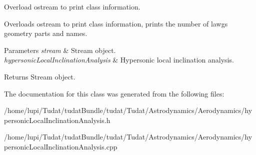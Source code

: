 Overload ostream to print class information. 

Overloads ostream to print class information, prints the number of lawgs geometry parts and names. 
\begin{DoxyParams}{Parameters}
{\em stream} & Stream object. \\
\hline
{\em hypersonic\+Local\+Inclination\+Analysis} & Hypersonic local inclination analysis. \\
\hline
\end{DoxyParams}
\begin{DoxyReturn}{Returns}
Stream object. 
\end{DoxyReturn}


The documentation for this class was generated from the following files\+:\begin{DoxyCompactItemize}
\item 
/home/lupi/\+Tudat/tudat\+Bundle/tudat/\+Tudat/\+Astrodynamics/\+Aerodynamics/hypersonic\+Local\+Inclination\+Analysis.\+h\item 
/home/lupi/\+Tudat/tudat\+Bundle/tudat/\+Tudat/\+Astrodynamics/\+Aerodynamics/hypersonic\+Local\+Inclination\+Analysis.\+cpp\end{DoxyCompactItemize}
